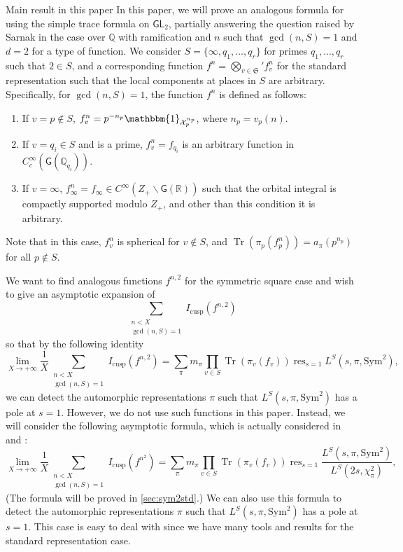 \documentclass[10pt,oneside,reqno]{amsart}
\makeatletter
\newcommand\cX{\mathcal{X}}
\newcommand\QQ{\mathbb{Q}}
\newcommand\RR{\mathbb{R}}
\newcommand\mf[1]{\mathfrak{#1}}
\newcommand\G{\mathsf{G}}
\newcommand\GL{\mathsf{GL}}
\newcommand\triv{\mathbbm{1}}
\newcommand\bs{\backslash}
\DeclareMathOperator\Tr{Tr}
\DeclareMathOperator\res{res}
\newcommand\cusp{\mathrm{cusp}}
\newcommand\Sym{\mathrm{Sym}}
\def\subsection{\@startsection{subsection}{2}%
  \z@{3pt\@plus0pt}{-.5em}%
  {\normalfont\bfseries}}
\theoremstyle{THEOREM}
\theoremstyle{DEFINITION}
\theoremstyle{EXERCISE}
\numberwithin{equation}{section}
\makeatother
\begin{document}
\subsection{Main result in this paper}
In this paper, we will prove an analogous formula for \cite{venkatesh2004} using the simple trace formula on $\GL_2$,
partially answering the question raised by Sarnak in the case over $\QQ$ with ramification and  $n$ such that $\gcd(n,S)=1$ and $d=2$ for a type of function.
We consider $S=\{\infty,q_1,\dots,q_r\}$ for primes $q_1,\dots,q_r$ such that $2\in S$, and a corresponding function $f^{n}=\bigotimes_{v\in \mf{S}}'f^n_v$ for the standard representation such that the local components at places in $S$ are arbitrary. 
Specifically, for $\gcd(n,S)=1$, the function $f^n$ is defined as follows:
\begin{enumerate}[itemsep=0pt,parsep=0pt,topsep=2pt,leftmargin=0pt,labelsep=3pt,itemindent=9pt,label=\textbullet]
  \item If $v=p\notin S$,  $f^{n}_v=p^{-n_p}\triv_{\cX_p^{n_p}}$, where $n_p=v_p(n)$.
  \item If $v=q_i\in S$ and is a prime,  $f^{n}_v=f_{q_i}$ is an arbitrary function in $C_c^\infty(\G(\QQ_{q_i}))$.
  \item If $v=\infty$,  $f^{n}_\infty=f_\infty\in C^\infty(Z_+\bs \G(\RR))$ such that the orbital integral is compactly supported modulo $Z_+$, and other than this condition it is arbitrary.
\end{enumerate}
Note that in this case, $f_v^{n}$ is spherical for $v\notin S$, and $\Tr(\pi_p(f_p^{n}))=a_{\pi}(p^{n_p})$ for all $p\notin S$. 

We want to find analogous functions $f^{n,2}$ for the symmetric square case and wish to give an asymptotic expansion of
\[
\sum_{\substack{n<X\\ \gcd(n,S)=1}}I_{\cusp}(f^{n,2})
\]
so that by the following identity
\[
\lim_{X\to +\infty}\frac{1}{X}\sum_{\substack{n<X\\\gcd(n,S)=1}}I_\cusp(f^{n,2})=\sum_{\pi}m_\pi \prod_{v\in S}\Tr(\pi_v(f_v))\res_{s=1}L^S(s,\pi,\Sym^2),
\]
we can detect the automorphic representations $\pi$ such that $L^S(s,\pi,\Sym^2)$ has a pole at $s=1$. However, we do not use such functions in this paper. Instead, we will consider the following asymptotic formula, which is actually considered in \cite{venkatesh2002} and \cite{venkatesh2004}:
\begin{equation}\label{eq:relationstandardtosym2}
\lim_{X\to +\infty}\frac{1}{X}\sum_{\substack{n<X\\\gcd(n,S)=1}}I_\cusp(f^{n^2})=\sum_{\pi}m_\pi \prod_{v\in S}\Tr(\pi_v(f_v))\res_{s=1}\frac{L^S(s,\pi,\Sym^2)}{L^S(2s,\chi_\pi^2)},
\end{equation} 
(The formula will be proved in \autoref{sec:sym2std}.)
We can also use this formula to detect the automorphic representations $\pi$ such that $L^S(s,\pi,\Sym^2)$ has a pole at $s=1$. This case is easy to deal with since we have many tools and results \cite{cheng2025,cheng2025b,cheng2025c} for the standard representation case.
\end{document}
